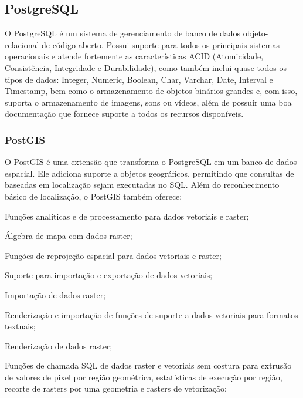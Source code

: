 {{{{{{{\subsection{PostgreSQL}

O PostgreSQL é um sistema de gerenciamento de banco de dados objeto-relacional de código aberto. Possui suporte para todos os principais sistemas operacionais e atende fortemente as características ACID (Atomicidade, Consistência, Integridade e Durabilidade), como também inclui quase todos os tipos de dados: Integer, Numeric, Boolean, Char, Varchar, Date, Interval e Timestamp, bem como o armazenamento de objetos binários grandes e, com isso, suporta o armazenamento de imagens, sons ou vídeos, além de possuir uma boa documentação que fornece suporte a todos os recursos disponíveis.

\subsubsection{PostGIS}

O PostGIS é uma extensão que transforma o PostgreSQL em um banco de dados espacial. Ele adiciona suporte a objetos geográficos, permitindo que consultas de baseadas em localização sejam executadas no SQL. Além do reconhecimento básico de localização, o PostGIS também oferece:

\begin{lista}
\item Funções analíticas e de processamento para dados vetoriais e raster;

\item Álgebra de mapa com dados raster;

\item Funções de reprojeção espacial para dados vetoriais e raster;

\item Suporte para importação e exportação de dados vetoriais;

\item Importação de dados raster;

\item Renderização e importação de funções de suporte a dados vetoriais para formatos textuais;

\item Renderização de dados raster;

\item Funções de chamada SQL de dados raster e vetoriais sem costura para extrusão de valores de pixel por região geométrica, estatísticas de execução por região, recorte de rasters por uma geometria e rasters de vetorização;


\end{lista}}}}}}}}
